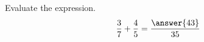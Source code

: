 \documentclass{ximera}
\author{David Kish}
\begin{document}
\begin{exercise}
Evaluate the expression.\\
\[
\frac{3}{7}+\frac{4}{5}=\frac{\answer{43}}{35}
\]
\end{exercise}
\end{document}
